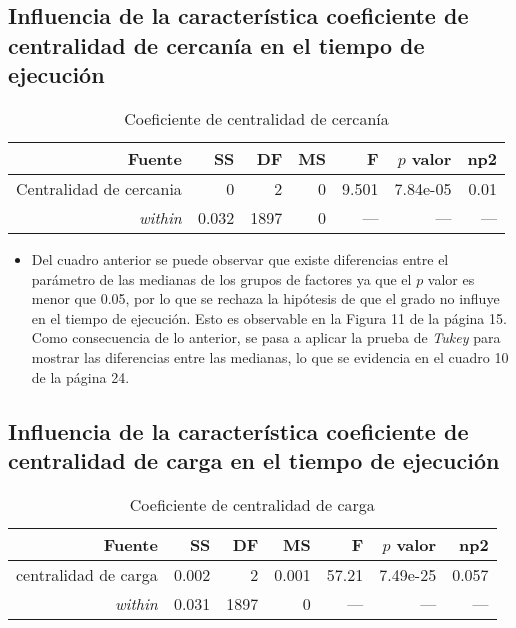 \documentclass{article}
\begin{document}
\subsection{Influencia de la característica coeficiente de centralidad de cercanía en el tiempo de ejecución} 
\begin{table}[H]
\caption{{\small Coeficiente de centralidad de cercanía}}
\begin{center}		
	\centering
		\begin{tabular}{rrrrrrr}		
			\hline
			\textbf{Fuente} & \textbf{SS} & \textbf{DF} & \textbf{MS}& \textbf{F}& \textbf{$p$ valor} & \textbf{np2}\\
			
			\hline
			 Centralidad de cercania & 0 & 2 & 0 & 9.501 & 7.84e-05 & 0.01 \\
			 \textit{within}    & 0.032 & 1897 & 0  & --- & --- & --- \\			 			 
			\hline
		\end{tabular}
		\label{cual}
	\label{tab:una-tablita}
\end{center}	
\end{table}

\begin{itemize}
  \item Del cuadro anterior se puede observar que existe diferencias entre el parámetro de las medianas de los grupos de factores ya que el $p$ valor es menor que 0.05, por lo que se rechaza la hipótesis de que el grado no influye en el tiempo de ejecución. Esto es observable en la Figura 11 de la página 15. Como consecuencia de lo anterior, se pasa a aplicar la prueba de \textit{Tukey} para mostrar las diferencias entre las medianas, lo que se evidencia en el cuadro 10 de la página 24.   
\end{itemize}

\subsection{Influencia de la característica coeficiente de centralidad de carga en el tiempo de ejecución} 
\begin{table}[H]
\caption{{\small Coeficiente de centralidad de carga}}
\begin{center}		
	\centering
		\begin{tabular}{rrrrrrr}		
			\hline
			\textbf{Fuente} & \textbf{SS} & \textbf{DF} & \textbf{MS}& \textbf{F}& \textbf{$p$ valor} & \textbf{np2}\\
			
			\hline
			 centralidad de carga & 0.002 & 2 & 0.001 & 57.21 & 7.49e-25 & 0.057 \\
			 \textit{within}    & 0.031 & 1897 & 0  & --- & --- & --- \\			 			 
			\hline
		\end{tabular}
		\label{cual}
	\label{tab:una-tablita}
\end{center}	
\end{table}
\end{document}
